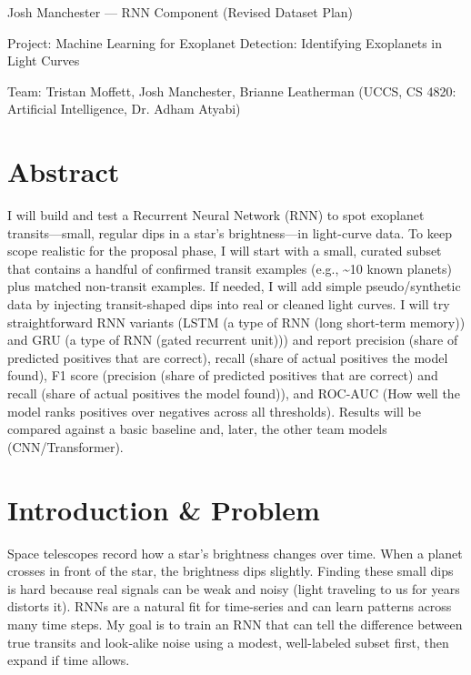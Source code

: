 \documentclass[letterpaper]{article}
\title{}
\author{}
\begin{document}
\maketitle
Josh Manchester — RNN Component (Revised Dataset Plan)

Project: Machine Learning for Exoplanet Detection: Identifying Exoplanets in Light Curves

Team: Tristan Moffett, Josh Manchester, Brianne Leatherman (UCCS, CS 4820: Artificial Intelligence, Dr. Adham Atyabi)


\section*{Abstract}
I will build and test a Recurrent Neural Network (RNN) to spot exoplanet transits—small, regular dips in a star’s brightness—in light-curve data. To keep scope realistic for the proposal phase, I will start with a small, curated subset that contains a handful of confirmed transit examples (e.g., \textasciitilde{}10 known planets) plus matched non-transit examples. If needed, I will add simple pseudo/synthetic data by injecting transit-shaped dips into real or cleaned light curves. I will try straightforward RNN variants (LSTM (a type of RNN (long short-term memory)) and GRU (a type of RNN (gated recurrent unit))) and report precision (share of predicted positives that are correct), recall (share of actual positives the model found), F1 score (precision (share of predicted positives that are correct) and recall (share of actual positives the model found)), and ROC-AUC (How well the model ranks positives over negatives across all thresholds). Results will be compared against a basic baseline and, later, the other team models (CNN/Transformer).

\section*{Introduction \& Problem}
Space telescopes record how a star’s brightness changes over time. When a planet crosses in front of the star, the brightness dips slightly. Finding these small dips is hard because real signals can be weak and noisy (light traveling to us for years distorts it). RNNs are a natural fit for time-series and can learn patterns across many time steps. My goal is to train an RNN that can tell the difference between true transits and look‑alike noise using a modest, well-labeled subset first, then expand if time allows.
\end{document}
